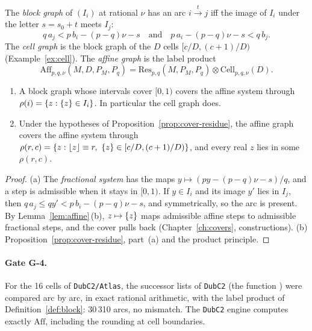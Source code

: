 \begin{definition}\label{def:block}
The \emph{block graph} of \((I_i)\) at rational \(\nu\) has an arc \(i\xrightarrow{t}j\) iff the
image of \(I_i\) under the letter \(s=s_0+t\) meets \(I_j\):
\[
q\,a_j<p\,b_i-(p-q)\nu-s\quad\text{and}\quad p\,a_i-(p-q)\nu-s<q\,b_j .
\]
The \emph{cell graph} is the block graph of the \(D\) cells \([c/D,(c+1)/D)\)
(Example~\ref{ex:cell}). The \emph{affine graph} is the label product
\[
\mathrm{Aff}_{p,q,\nu}(M,D,P_M,P_q)=\mathrm{Res}_{p,q}(M,P_M,P_q)\otimes\mathrm{Cell}_{p,q,\nu}(D).
\]
\end{definition}

\begin{theorem}\label{thm:cover-affine}
\begin{enumerate}[label=(\alph*)]
\item A block graph whose intervals cover \([0,1)\) covers the affine system through
  \(\rho(i)=\{z:\{z\}\in I_i\}\). In particular the cell graph does.
\item Under the hypotheses of Proposition~\ref{prop:cover-residue}, the affine graph covers the
  affine system through \(\rho(r,c)=\{z:\lfloor z\rfloor\equiv r,\ \{z\}\in[c/D,(c+1)/D)\}\),
  and every real \(z\) lies in some \(\rho(r,c)\).
\end{enumerate}
\end{theorem}

\begin{proof}
(a) The \emph{fractional system} has the maps \(y\mapsto(py-(p-q)\nu-s)/q\), and a step is
admissible when it stays in \([0,1)\). If \(y\in I_i\) and its image \(y'\) lies in \(I_j\),
then \(q\,a_j\le qy'<p\,b_i-(p-q)\nu-s\), and symmetrically, so the arc is present. By
Lemma~\ref{lem:affine}\,(b), \(z\mapsto\{z\}\) maps admissible affine steps to admissible
fractional steps, and the cover pulls back (Chapter~\ref{ch:covers}, constructions).
(b) Proposition~\ref{prop:cover-residue}, part~(a) and the product principle.
\end{proof}

\paragraph{Gate G-4.} For the 16 cells of \texttt{DubC2/Atlas}, the successor lists of
\texttt{DubC2} (the function ) were compared arc by arc, in exact rational arithmetic, with the
label product of Definition~\ref{def:block}: 30\,310 arcs, no mismatch. The \texttt{DubC2}
engine computes exactly \(\mathrm{Aff}\), including the rounding at cell boundaries.

